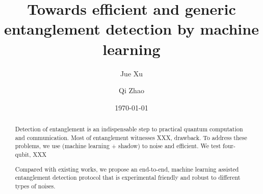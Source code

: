\documentclass[
aps,
pra,
twocolumn,
floatfix,
]{revtex4-2}
\theoremstyle{plain}
\theoremstyle{definition}
\begin{document}
\title{Towards efficient and generic entanglement detection by machine learning}
\author{Jue Xu}
\author{Qi Zhao}
\date{\today}
\begin{abstract}
	Detection of entanglement is an indispensable step to practical quantum computation and communication. 
	Most of entanglement witnesses XXX,   drawback. To address these problems, we use (machine learning + shadow) to     noise and efficient. 
	We test four-qubit, XXX  
	
	
	
	Compared with existing works, we propose an end-to-end, machine learning assisted entanglement detection protocol that is experimental friendly and robust to different types of noises.
\end{abstract}

\maketitle

\end{document}
